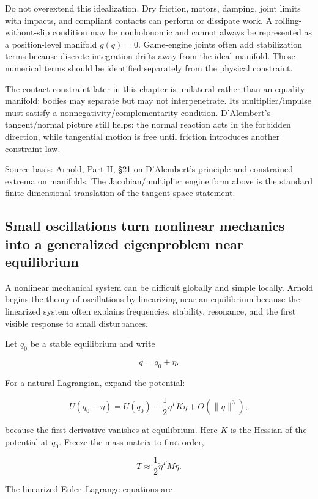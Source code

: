 Do not overextend this idealization. Dry friction, motors, damping, joint limits with impacts, and compliant contacts can perform or dissipate work. A rolling-without-slip condition may be nonholonomic and cannot always be represented as a position-level manifold \(g(q)=0\). Game-engine joints often add stabilization terms because discrete integration drifts away from the ideal manifold. Those numerical terms should be identified separately from the physical constraint.

The contact constraint later in this chapter is unilateral rather than an equality manifold: bodies may separate but may not interpenetrate. Its multiplier/impulse must satisfy a nonnegativity/complementarity condition. D'Alembert's tangent/normal picture still helps: the normal reaction acts in the forbidden direction, while tangential motion is free until friction introduces another constraint law.

Source basis: Arnold, Part II, §21 on D'Alembert's principle and constrained extrema on manifolds. The Jacobian/multiplier engine form above is the standard finite-dimensional translation of the tangent-space statement.

\subsection{Small oscillations turn nonlinear mechanics into a generalized eigenproblem near equilibrium}\label{02-foundations-ii-ch039-small-oscillations-turn-nonlinear-mechanics-into-a-generalized-eigenproblem-near-equilibrium}

A nonlinear mechanical system can be difficult globally and simple locally. Arnold begins the theory of oscillations by linearizing near an equilibrium because the linearized system often explains frequencies, stability, resonance, and the first visible response to small disturbances.

Let \(q_0\) be a stable equilibrium and write

\[
q=q_0+\eta.
\]

For a natural Lagrangian, expand the potential:

\[
U(q_0+\eta)
=
U(q_0)
+
\frac12\eta^T K\eta
+
O(\|\eta\|^3),
\]

because the first derivative vanishes at equilibrium. Here \(K\) is the Hessian of the potential at \(q_0\). Freeze the mass matrix to first order,

\[
T
\approx
\frac12\dot\eta^T M\dot\eta.
\]

The linearized Euler--Lagrange equations are

